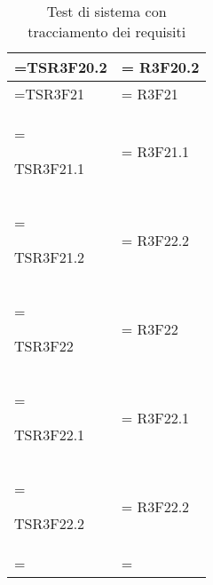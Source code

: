 \begin{xltabular}{\textwidth} {
            >{\hsize\linewidth=\hsize}X
            >{\hsize\linewidth=\hsize}X
        }
        TSR3F20.2 &
        R3F20.2
        \\ \hline

        TSR3F21 &
        R3F21
        \\ \hline

        TSR3F21.1 &
        R3F21.1
        \\ \hline

        TSR3F21.2 &
        R3F22.2 
        \\ \hline

        TSR3F22 &
        R3F22
        \\ \hline

        TSR3F22.1 &
        R3F22.1
        \\ \hline

        TSR3F22.2 &
        R3F22.2
        \\ \hline

        \caption{Test di sistema con tracciamento dei requisiti}
    \end{xltabular}

    \pagebreak